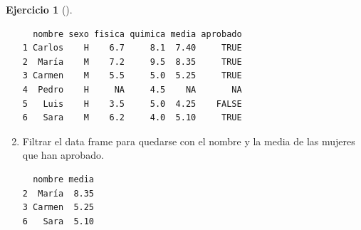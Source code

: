 \documentclass[
  a4paper,
]{scrreport}
\newenvironment{Shaded}{\begin{snugshade}}{\end{snugshade}}
\newcommand{\DecValTok}[1]{\textcolor[rgb]{0.68,0.00,0.00}{#1}}
\newcommand{\FunctionTok}[1]{\textcolor[rgb]{0.28,0.35,0.67}{#1}}
\newcommand{\NormalTok}[1]{\textcolor[rgb]{0.00,0.23,0.31}{#1}}
\newcommand{\SpecialCharTok}[1]{\textcolor[rgb]{0.37,0.37,0.37}{#1}}
\newcommand{\StringTok}[1]{\textcolor[rgb]{0.13,0.47,0.30}{#1}}
\theoremstyle{definition}
\newtheorem{exercise}{Ejercicio}[chapter]
\theoremstyle{remark}
\begin{document}
\begin{exercise}[]
\begin{enumerate}
\begin{tcolorbox}
\begin{verbatim}
  nombre sexo fisica quimica media aprobado
1 Carlos    H    6.7     8.1  7.40     TRUE
2  María    M    7.2     9.5  8.35     TRUE
3 Carmen    M    5.5     5.0  5.25     TRUE
4  Pedro    H     NA     4.5    NA       NA
5   Luis    H    3.5     5.0  4.25    FALSE
6   Sara    M    6.2     4.0  5.10     TRUE
\end{verbatim}

  \end{tcolorbox}
\item
  Filtrar el data frame para quedarse con el nombre y la media de las
  mujeres que han aprobado.

  \begin{tcolorbox}[enhanced jigsaw, toprule=.15mm, rightrule=.15mm, arc=.35mm, colback=white, colbacktitle=quarto-callout-tip-color!10!white, toptitle=1mm, left=2mm, colframe=quarto-callout-tip-color-frame, opacityback=0, breakable, opacitybacktitle=0.6, bottomtitle=1mm, titlerule=0mm, title=\textcolor{quarto-callout-tip-color}{\faLightbulb}\hspace{0.5em}{Solución}, bottomrule=.15mm, coltitle=black, leftrule=.75mm]

\begin{Shaded}
\end{Shaded}

\begin{verbatim}
  nombre media
2  María  8.35
3 Carmen  5.25
6   Sara  5.10
\end{verbatim}

  \end{tcolorbox}
\end{enumerate}

\end{exercise}
\end{document}
